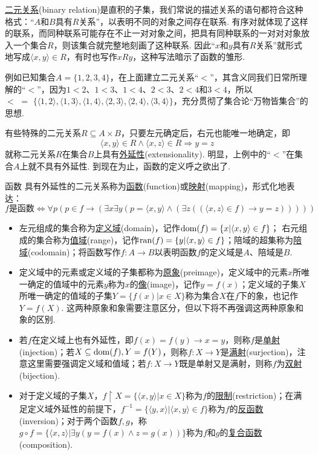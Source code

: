 \uline{二元关系}(binary relation)是直积的子集，我们常说的描述关系的语句都符合这种格式：“\(A\)和\(B\)具有\(R\)关系”，以表明不同的对象之间存在联系. 有序对就体现了这样的联系，而同种联系可能存在不止一对对象之间，把具有同种联系的一对对对象放入一个集合\(R\)，则该集合就完整地刻画了这种联系. 因此“\(x\)和\(y\)具有\(R\)关系”就形式地写成\(\langle x,y \rangle \in R\)，有时也写作\(xRy\)，这种写法暗示了函数的雏形.

例如已知集合\(A=\{1,2,3,4\}\)，在上面建立二元关系“\(<\)”，其含义同我们日常所理解的“\(<\)”，因为\(1<2\)、\(1<3\)、\(1<4\)、\(2<3\)、\(2<4\)和\(3<4\)，所以\(<\,\,=\,\,\{\langle 1,2 \rangle,\langle 1,3 \rangle,\langle 1,4 \rangle,\langle 2,3 \rangle,\langle 2,4 \rangle,\langle 3,4 \rangle\}\)，充分贯彻了集合论“万物皆集合”的思想.

有些特殊的二元关系\(R \subseteq A \times B\)，只要左元确定后，右元也能唯一地确定，即
\[\langle x,y \rangle \in R \wedge \langle x,z \rangle \in R \Rightarrow y=z\]
就称二元关系\(R\)在集合\(B\)上具有\uline{外延性}(extensionality). 明显，上例中的“\(<\)”在集合\(A\)上就不具有外延性. 到现在为止，函数的定义呼之欲出了.

\begin{definition}{函数}
    具有外延性的二元关系称为\uline{函数}(function)或\uline{映射}(mapping)，形式化地表达：
    \[f \mbox{是函数} \Longleftrightarrow \forall p (p \in f \rightarrow (\exists x \exists y(p = \langle x,y \rangle \wedge (\exists z((\langle x,z \rangle \in f) \rightarrow y=z)))))\]
    \begin{itemize}
        \item [\(\bullet\)] 左元组成的集合称为\uline{定义域}(domain)，记作\({\rm dom}(f)= \{x | \langle x,y \rangle \in f\}\)； 右元组成的集合称为\uline{值域}(range)，记作\({\rm ran}(f)= \{y | \langle x,y \rangle \in f\}\)；陪域的超集称为\uline{陪域}(codomain)；将函数写作\(f:A \to B\)以表明函数\(f\)的定义域是\(A\)、陪域是\(B\).
        \item [\(\bullet\)] 定义域中的元素或定义域的子集都称为\uline{原象}(preimage)，定义域中的元素\(x\)所唯一确定的值域中的元素\(y\)称为\(x\)的\uline{像}(image)，记作\(y=f(x)\)；定义域的子集\(X\)所唯一确定的值域的子集\(Y=\{f(x)|x \in X\}\)称为集合\(X\)在\(f\)下的象，也记作\(Y=f(X)\). 这两种原象和象需要注意区分，但以下将不再强调这两种原象和象的区别.
        \item [\(\bullet\)] 若\(f\)在定义域上也有外延性，即\(f(x)=f(y) \rightarrow x=y\)，则称\(f\)是\uline{单射}(injection)；若\(X\subseteq{\rm dom}(f), Y=f(Y)\)，则称\(f:X\to Y\)是\uline{满射}(surjection)，注意这里需要强调定义域和值域；若\(f:X \to Y\)既是单射又是满射，则称\(f\)为\uline{双射}(bijection).
        \item [\(\bullet\)] 对于定义域的子集\(X\)，\(f\upharpoonright X=\{\langle x,y \rangle|x \in X\}\)称为\(f\)的\uline{限制}(restriction)；在满足定义域外延性的前提下，\(f^{-1}=\{\langle y,x \rangle | \langle x,y \rangle \in f\}\)称为\(f\)的\uline{反函数}(inversion)；对于两个函数\(f,g\)，称\(g \circ f = \{\langle x,z \rangle| \exists y(y=f(x) \wedge z=g(x))\}\)称为\(f\)和\(g\)的\uline{复合函数}(composition).
    \end{itemize}
\end{definition}

